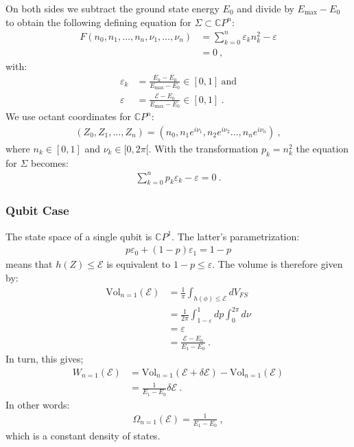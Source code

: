 \documentclass[draft,nofootinbib,pre,twocolumn,showpacs,showkeys,groupaddress,preprintnumbers,floatfix]{revtex4-1}
\newcommand{\1}{\mathbbm{1}}
\begin{document}
On both sides we subtract the ground state energy $E_0$ and divide by $E_{\mathrm{max}} - E_0$ to obtain the following defining equation for $\Sigma \subset \mathbb{C}P^n$:
\begin{align*}
F(n_0,n_1,\ldots, n_n, \nu_1, \ldots, \nu_n)
  & = \sum_{k=0}^n \varepsilon_k n_k^2 - \varepsilon \\
  & = 0 
  ~,
\end{align*}
with:
\begin{align*}
 \varepsilon_k & = \frac{E_k - E_0}{E_{\mathrm{max}}-E_0} \in [0,1]
 ~\text{and}\\
  \varepsilon & = \frac{\mathcal{E}-E_0}{E_{\mathrm{max}}-E_0} \in [0,1]
  ~.
\end{align*}
We use octant coordinates for $\mathbb{C}P^n$:
\begin{align*}
(Z_0,Z_1,\ldots,Z_n)
  = \left( n_0,n_1e^{i\nu_1},n_2e^{i\nu_2} \ldots, n_n e^{i\nu_n}\right)
  ~,
\end{align*}
where $n_k \in [0,1]$ and $\nu_k \in [0,2\pi[$.
With the transformation $p_k = n_k^2$ the equation for $\Sigma$ becomes:
\begin{align*}
\sum_{k=0}^n p_k \varepsilon_k - \varepsilon = 0
  ~.
\end{align*}

\subsubsection{Qubit Case}

The state space of a single qubit is $\mathbb{C}P^1$. The latter's
parametrization:
\begin{align*}
p \varepsilon_0 + (1-p) \varepsilon_1 = 1-p
\end{align*}
means that $h(Z) \leq \mathcal{E}$ is equivalent to $1-p \leq \varepsilon$.
The volume is therefore given by:
\begin{align*}
\mathrm{Vol}_{n=1}(\mathcal{E})
  & = \frac{1}{\pi} \int_{h(\phi)\leq \mathcal{E}} dV_{FS} \\
  & = \frac{1}{2\pi} \int_{1-\varepsilon}^1 dp \int_{0}^{2\pi} d \nu \\
  & = \varepsilon \\
  & = \frac{\mathcal{E}-E_0}{E_1-E_0}
  ~.
\end{align*}
In turn, this gives;
\begin{align*}
W_{n=1}(\mathcal{E}) 
  & = \mathrm{Vol}_{n=1}(\mathcal{E}+\delta \mathcal{E}) -
  \mathrm{Vol}_{n=1}(\mathcal{E}) \\
  & = \frac{1}{E_1-E_0} \delta \mathcal{E}
  ~.
\end{align*}
In other words:
\begin{align*}
\Omega_{n=1}(\mathcal{E}) = \frac{1}{E_1-E_0}
  ~,
\end{align*}
which is a constant density of states.
\end{document}
